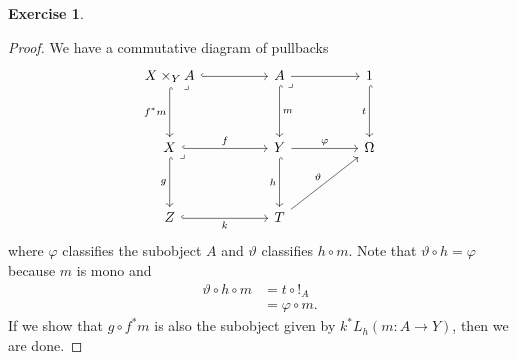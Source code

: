 \documentclass{article}
\theoremstyle{definition}
\newtheorem{question}{Exercise}
\begin{document}
\begin{question}
\begin{enumerate}[a)]
              \begin{proof}
                  We have a commutative diagram of pullbacks
                  \begin{equation}
                      \begin{tikzcd}[ampersand replacement=\&]
                          {X\times_{Y}A} \&\& A \&\& 1 \\
                          \\
                          X \&\& Y \&\& \Omega \\
                          \\
                          Z \&\& T
                          \arrow["f", hook, from=3-1, to=3-3]
                          \arrow["g"', hook, from=3-1, to=5-1]
                          \arrow["k"', hook, from=5-1, to=5-3]
                          \arrow["h"', hook, from=3-3, to=5-3]
                          \arrow["{f^{*}m}"', hook, from=1-1, to=3-1]
                          \arrow[from=1-1, hook, to=1-3]
                          \arrow["m", hook, from=1-3, to=3-3]
                          \arrow["\lrcorner"{anchor=center, pos=0}, draw=none, from=1-1, to=3-3]
                          \arrow["\lrcorner"{anchor=center, pos=0}, draw=none, from=3-1, to=5-3]
                          \arrow["\varphi", from=3-3, to=3-5]
                          \arrow[from=1-3, to=1-5]
                          \arrow["t"', hook, from=1-5, to=3-5]
                          \arrow["\lrcorner"{anchor=center, pos=0}, draw=none, from=1-3, to=3-5]
                          \arrow["{\vartheta}", from=5-3, to=3-5]
                      \end{tikzcd}
                      \label{eq:pullback-galore}
                  \end{equation}
                  where \(\varphi\) classifies the subobject \(A\) and
                  \(\vartheta\) classifies \(h\circ m\). Note that
                  \(\vartheta\circ h=\varphi\) because \(m\) is mono and
                  \begin{align*}
                      \vartheta\circ h\circ m & =t\circ !_{A}    \\
                                              & =\varphi\circ m.
                  \end{align*}
                  If we show that \(g\circ f^{*}m\) is also the subobject given
                  by \(k^{*}L_{h}(m:A\to Y)\), then we are done.


\end{proof}
\end{enumerate}
\end{question}
\end{document}
